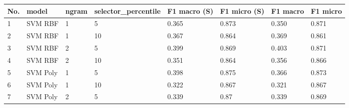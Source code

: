 \documentclass[a4paper]{article}
\begin{document}
\begin{table}[h]
\centering
\begin{tabular}{llllllll}
\hline
\multicolumn{1}{|l|}{No.} & \multicolumn{1}{l|}{model}       & \multicolumn{1}{l|}{ngram} & \multicolumn{1}{l|}{selector\_percentile} & \multicolumn{1}{l|}{F1 macro (S)} & \multicolumn{1}{l|}{F1 micro (S)} & \multicolumn{1}{l|}{F1 macro} & \multicolumn{1}{l|}{F1 micro} \\ \hline
\multicolumn{1}{|l|}{1}   & \multicolumn{1}{l|}{SVM RBF}     & \multicolumn{1}{l|}{1}     & \multicolumn{1}{l|}{5}                    & \multicolumn{1}{l|}{0.365}        & \multicolumn{1}{l|}{0.873}        & \multicolumn{1}{l|}{0.350}    & \multicolumn{1}{l|}{0.871}    \\ \hline
\multicolumn{1}{|l|}{2}   & \multicolumn{1}{l|}{SVM RBF}     & \multicolumn{1}{l|}{1}     & \multicolumn{1}{l|}{10}                   & \multicolumn{1}{l|}{0.367}        & \multicolumn{1}{l|}{0.864}        & \multicolumn{1}{l|}{0.369}    & \multicolumn{1}{l|}{0.861}    \\ \hline
\multicolumn{1}{|l|}{3}   & \multicolumn{1}{l|}{SVM RBF}     & \multicolumn{1}{l|}{2}     & \multicolumn{1}{l|}{5}                    & \multicolumn{1}{l|}{0.399}        & \multicolumn{1}{l|}{0.869}        & \multicolumn{1}{l|}{0.403}    & \multicolumn{1}{l|}{0.871}    \\ \hline
\multicolumn{1}{|l|}{4}   & \multicolumn{1}{l|}{SVM RBF}     & \multicolumn{1}{l|}{2}     & \multicolumn{1}{l|}{10}                   & \multicolumn{1}{l|}{0.351}        & \multicolumn{1}{l|}{0.864}        & \multicolumn{1}{l|}{0.356}    & \multicolumn{1}{l|}{0.866}    \\ \hline
\multicolumn{1}{|l|}{5}   & \multicolumn{1}{l|}{SVM Poly}    & \multicolumn{1}{l|}{1}     & \multicolumn{1}{l|}{5}                    & \multicolumn{1}{l|}{0.398}        & \multicolumn{1}{l|}{0.875}        & \multicolumn{1}{l|}{0.366}    & \multicolumn{1}{l|}{0.873}    \\ \hline
\multicolumn{1}{|l|}{6}   & \multicolumn{1}{l|}{SVM Poly}    & \multicolumn{1}{l|}{1}     & \multicolumn{1}{l|}{10}                   & \multicolumn{1}{l|}{0.322}        & \multicolumn{1}{l|}{0.867}        & \multicolumn{1}{l|}{0.321}    & \multicolumn{1}{l|}{0.867}    \\ \hline
\multicolumn{1}{|l|}{7}   & \multicolumn{1}{l|}{SVM Poly}    & \multicolumn{1}{l|}{2}     & \multicolumn{1}{l|}{5}                    & \multicolumn{1}{l|}{0.339}        & \multicolumn{1}{l|}{0.87}         & \multicolumn{1}{l|}{0.339}    & \multicolumn{1}{l|}{0.869}    \\ \hline

\end{tabular}
\end{table}
\end{document}
